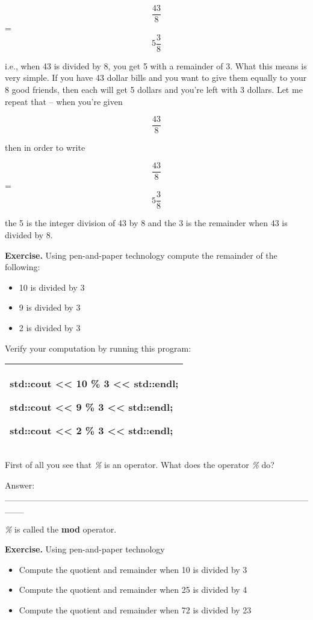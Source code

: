 \documentclass[
]{article}
\providecommand{\tightlist}{%
  \setlength{\itemsep}{0pt}\setlength{\parskip}{0pt}}
\begin{document}
\[\frac{43}{8}\] =\[5\frac{3}{8}\]

i.e., when 43 is divided by 8, you get 5 with a remainder of 3. What
this means is very simple. If you have 43 dollar bills and you want to
give them equally to your 8 good friends, then each will get 5 dollars
and you're left with 3 dollars. Let me repeat that -- when you're given

\[\frac{43}{8}\]

then in order to write

\[\frac{43}{8}\] =\[5\frac{3}{8}\]

the 5 is the integer division of 43 by 8 and the 3 is the remainder when
43 is divided by 8.

\textbf{Exercise.} Using pen-and-paper technology compute the remainder
of the following:

\begin{itemize}
\tightlist
\item
  10 is divided by 3
\item
  9 is divided by 3
\item
  2 is divided by 3
\end{itemize}

Verify your computation by running this program:

\begin{longtable}[]{@{}l@{}}
\toprule
\endhead
\begin{minipage}[t]{0.97\columnwidth}\raggedright
std::cout \textless\textless{} 10 \% 3 \textless\textless{} std::endl;

std::cout \textless\textless{} 9 \% 3 \textless\textless{} std::endl;

std::cout \textless\textless{} 2 \% 3 \textless\textless{}
std::endl;\strut
\end{minipage}\tabularnewline
\bottomrule
\end{longtable}

First of all you see that \emph{\%} is an operator. What does the
operator \emph{\%} do?

Answer:
\_\_\_\_\_\_\_\_\_\_\_\_\_\_\_\_\_\_\_\_\_\_\_\_\_\_\_\_\_\_\_\_\_\_\_\_\_\_\_\_\_\_\_\_\_\_\_\_\_\_\_

\emph{\%} is called the \textbf{mod} operator.

\textbf{Exercise.} Using pen-and-paper technology

\begin{itemize}
\tightlist
\item
  Compute the quotient and remainder when 10 is divided by 3
\item
  Compute the quotient and remainder when 25 is divided by 4
\item
  Compute the quotient and remainder when 72 is divided by 23
\end{itemize}
\end{document}

